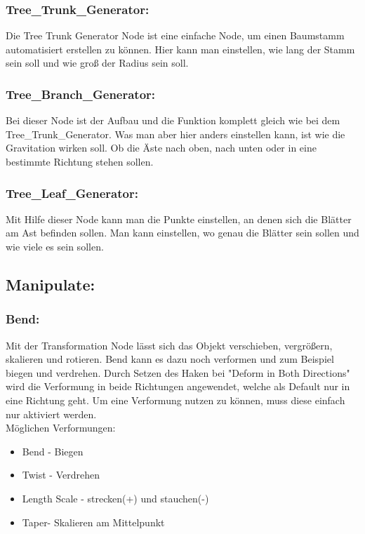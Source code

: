 \documentclass[paper=a4,fontsize=12pt,ngerman]{scrartcl}
\begin{document}
	\subsubsection*{Tree\_Trunk\_Generator:}
	Die Tree Trunk Generator Node ist eine einfache Node, um einen Baumstamm automatisiert erstellen zu können. Hier kann man einstellen, wie lang der Stamm sein soll und wie groß der Radius sein soll.
	\subsubsection*{Tree\_Branch\_Generator:}
	Bei dieser Node ist der Aufbau und die Funktion komplett gleich wie bei dem Tree\_Trunk\_Generator. Was man aber hier anders einstellen kann, ist wie die Gravitation wirken soll. Ob die Äste nach oben, nach unten oder in eine bestimmte Richtung stehen sollen.
	\subsubsection*{Tree\_Leaf\_Generator:}
	Mit Hilfe dieser Node kann man die Punkte einstellen, an denen sich die Blätter am Ast befinden sollen. Man kann einstellen, wo genau die Blätter sein sollen und wie viele es sein sollen. 
	
	\subsection*{Manipulate:}
	\subsubsection*{Bend:}
	Mit der Transformation Node lässt sich das Objekt verschieben, vergrößern, skalieren und rotieren. Bend kann es dazu noch verformen und zum Beispiel biegen und verdrehen. Durch Setzen des Haken bei "Deform in Both Directions" wird die Verformung in beide Richtungen angewendet, welche als Default nur in eine Richtung geht. Um eine Verformung nutzen zu können, muss diese einfach nur aktiviert werden.\\
	Möglichen Verformungen:
	\begin{itemize}
		\item Bend - Biegen
		\item Twist - Verdrehen
		\item Length Scale - strecken(+) und stauchen(-)
		\item Taper- Skalieren am Mittelpunkt
	\end{itemize}
\end{document}
